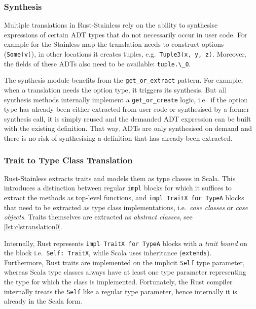 \subsubsection{Synthesis}

Multiple translations in Rust-Stainless rely on the ability to synthesise
expressions of certain ADT types that do not necessarily occur in user code. For
example for the Stainless map the translation needs to construct options
(\passthrough{\lstinline!Some(v)!}), in other locations it creates tuples,
e.g.~\passthrough{\lstinline!Tuple3(x, y, z)!}. Moreover, the fields of these
ADTs also need to be available: \lstinline!tuple.\_0!.

The synthesis module benefits from the \lstinline!get_or_extract! pattern. For
example, when a translation needs the option type, it triggers its synthesis.
But all synthesis methods internally implement a \lstinline!get_or_create!
logic, i.e.~if the option type has already been either extracted from user code
or synthesised by a former synthesis call, it is simply reused and the demanded
ADT expression can be built with the existing definition. That way, ADTs are
only synthesised on demand and there is no risk of synthesising a definition
that has already been extracted.

\subsubsection{Trait to Type Class Translation}
\label{type-class-extraction}

Rust-Stainless extracts traits and models them as type classes in Scala. This
introduces a distinction between regular \lstinline!impl! blocks for which it
suffices to extract the methods as top-level functions, and
\passthrough{\lstinline!impl TraitX for TypeA!} blocks that need to be extracted
as type class implementations, i.e.~\emph{case classes} or \emph{case objects}.
Traits themselves are extracted as \emph{abstract classes}, see
\autoref{lst:clstranslation0}.

Internally, Rust represents \passthrough{\lstinline!impl TraitX for TypeA!}
blocks with a \emph{trait bound} on the block i.e.~\passthrough{\lstinline!Self:
TraitX!}, while Scala uses inheritance (\passthrough{\lstinline!extends!}).
Furthermore, Rust traits are implemented on the implicit \lstinline!Self! type
parameter, whereas Scala type classes always have at least one type parameter
representing the type for which the class is implemented. Fortunately, the Rust
compiler internally treats the \lstinline!Self! like a regular type parameter,
hence internally it is already in the Scala form.


